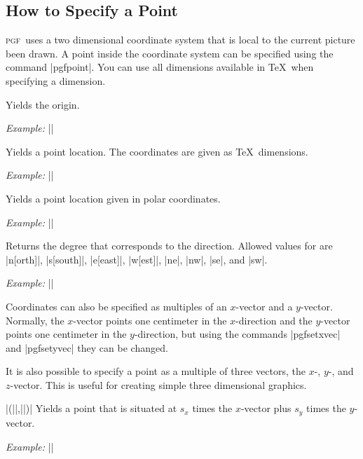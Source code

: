 \documentclass{ltxdoc}
\def\pgf{\textsc{pgf}}
\def\example{\par\smallskip\noindent\textit{Example: }}
\begin{document}
\subsection{How to Specify a Point}

\pgf\ uses a two dimensional coordinate system that is local to the
current picture been drawn. A point inside the coordinate system can
be specified using the command |pgfpoint|. You can use all
dimensions available in \TeX\ when specifying a dimension.

\begin{command}{\pgforigin}
  Yields the origin.
  \example |\pgmoveto{\pgforigin}|
\end{command}


\begin{command}{\pgfpoint{}}
  Yields a point location. The coordinates are given as \TeX\ dimensions.
  \example |\pgfline{\pgfpoint{10sp}{-1.5cm}}{\pgfpoint{10pt}{1cm}}|
\end{command}

\begin{command}{\pgfpolar{}}
  Yields a point location given in polar coordinates.
  \example ||
\end{command}

\begin{command}{\pgfdirection{}}
    Returns the degree that corresponds to the direction.
  Allowed values for  are
  |n[orth]|, |s[south]|, |e[east]|,
  |w[est]|, |ne|, |nw|, |se|, and |sw|.
  \example ||
\end{command}

Coordinates can also be specified as multiples of an $x$-vector and a
$y$-vector. Normally, the $x$-vector points one centimeter in the
$x$-direction and the $y$-vector points one centimeter in the
$y$-direction, but using the commands |pgfsetxvec| and
|pgfsetyvec| they can be changed.

It is also possible to specify a point as a multiple of three vectors,
the $x$-, $y$-, and $z$-vector. This is useful for creating simple
three dimensional graphics.

\begin{command}{\pgfxy|(||,||)|}
  Yields a point that is situated at $s_x$ times the
  $x$-vector plus $s_y$ times the $y$-vector.
  \example ||
\end{command}
\end{document}
